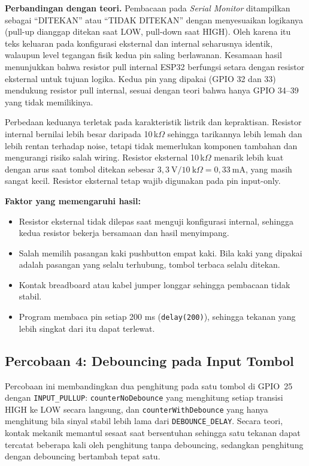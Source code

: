 \textbf{Perbandingan dengan teori.} Pembacaan pada \textit{Serial Monitor} ditampilkan sebagai ``DITEKAN'' atau ``TIDAK DITEKAN'' dengan menyesuaikan logikanya (pull-up dianggap ditekan saat LOW, pull-down saat HIGH). Oleh karena itu teks keluaran pada konfigurasi eksternal dan internal seharusnya identik, walaupun level tegangan fisik kedua pin saling berlawanan. Kesamaan hasil menunjukkan bahwa resistor pull internal ESP32 berfungsi setara dengan resistor eksternal untuk tujuan logika. Kedua pin yang dipakai (GPIO 32 dan 33) mendukung resistor pull internal, sesuai dengan teori bahwa hanya GPIO 34--39 yang tidak memilikinya.

Perbedaan keduanya terletak pada karakteristik listrik dan kepraktisan. Resistor internal bernilai lebih besar daripada 10\,k$\Omega$ sehingga tarikannya lebih lemah dan lebih rentan terhadap noise, tetapi tidak memerlukan komponen tambahan dan mengurangi risiko salah wiring. Resistor eksternal 10\,k$\Omega$ menarik lebih kuat dengan arus saat tombol ditekan sebesar $3{,}3\ \mathrm{V} / 10\ \mathrm{k}\Omega = 0{,}33\ \mathrm{mA}$, yang masih sangat kecil. Resistor eksternal tetap wajib digunakan pada pin input-only.

\textbf{Faktor yang memengaruhi hasil:}
\begin{itemize}
  \item Resistor eksternal tidak dilepas saat menguji konfigurasi internal, sehingga kedua resistor bekerja bersamaan dan hasil menyimpang.
  \item Salah memilih pasangan kaki pushbutton empat kaki. Bila kaki yang dipakai adalah pasangan yang selalu terhubung, tombol terbaca selalu ditekan.
  \item Kontak breadboard atau kabel jumper longgar sehingga pembacaan tidak stabil.
  \item Program membaca pin setiap 200 ms (\texttt{delay(200)}), sehingga tekanan yang lebih singkat dari itu dapat terlewat.
\end{itemize}

\subsection{Percobaan 4: Debouncing pada Input Tombol}

Percobaan ini membandingkan dua penghitung pada satu tombol di GPIO~25 dengan \texttt{INPUT\_PULLUP}: \texttt{counterNoDebounce} yang menghitung setiap transisi HIGH ke LOW secara langsung, dan \texttt{counterWithDebounce} yang hanya menghitung bila sinyal stabil lebih lama dari \texttt{DEBOUNCE\_DELAY}. Secara teori, kontak mekanik memantul sesaat saat bersentuhan sehingga satu tekanan dapat tercatat beberapa kali oleh penghitung tanpa debouncing, sedangkan penghitung dengan debouncing bertambah tepat satu.

